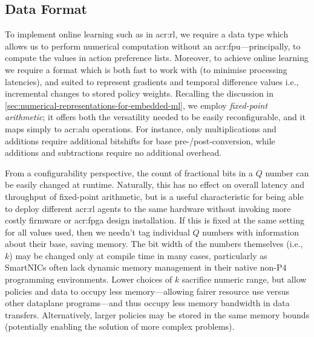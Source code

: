 \subsection{Data Format}\label{sec:opal-data-format}
To implement online learning such as in \gls{acr:rl}, we require a data type which allows us to perform numerical computation without an \gls{acr:fpu}---principally, to compute the values in action preference lists.
Moreover, to achieve online learning we require a format which is both fast to work with (to minimise processing latencies), and suited to represent gradients and temporal difference values i.e., incremental changes to stored policy weights.
Recalling the discussion in \cref{sec:numerical-representations-for-embedded-ml}, we employ \emph{fixed-point arithmetic}; it offers both the versatility needed to be easily reconfigurable, and it maps simply to \gls{acr:alu} operations.
For instance, only multiplications and additions require additional bitshifts for base pre-/post-conversion, while additions and subtractions require no additional overhead.


From a configurability perspective, the count of fractional bits in a $Q$ number can be easily changed at runtime.
Naturally, this has no effect on overall latency and throughput of fixed-point arithmetic, but is a useful characteristic for being able to deploy different \gls{acr:rl} agents to the same hardware without invoking more costly firmware or \gls{acr:fpga} design installation.
If this is fixed at the same setting for all values used, then we needn't tag individual $Q$ numbers with information about their base, saving memory.
The bit width of the numbers themselves (i.e., $k$) may be changed only at compile time in many cases, particularly as SmartNICs often lack dynamic memory management in their native non-P4 programming environments.
Lower choices of $k$ sacrifice numeric range, but allow policies and data to occupy less memory---allowing fairer resource use versus other dataplane programs---and thus occupy less memory bandwidth in data transfers.
Alternatively, larger policies may be stored in the same memory bounds (potentially enabling the solution of more complex problems).

